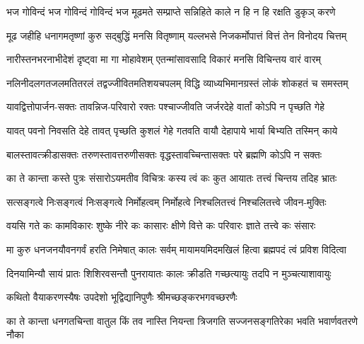 \setlength{\shlokaspaceskip}{6pt}
\setlength{\columnseprule}{0pt}
\setlength{\columnsep}{10pt}
\begin{large}
\begin{multicols}{2}
\begin{flushleft}
\fourlineindentedshloka
{भज गोविन्दं भज गोविन्दं}
{गोविन्दं भज मूढमते}
{सम्प्राप्ते सन्निहिते काले}
{न हि न हि रक्षति डुकृञ् करणे}

\fourlineindentedshloka
{मूढ जहीहि धनागमतृष्णां}
{कुरु सद्बुद्धिं मनसि वितृष्णाम्}
{यल्लभसे निजकर्मोपात्तं}
{वित्तं तेन विनोदय चित्तम्}

\fourlineindentedshloka
{नारीस्तनभरनाभीदेशं}
{दृष्ट्वा मा गा मोहावेशम्}
{एतन्मांसावसादि विकारं}
{मनसि विचिन्तय वारं वारम्}

\fourlineindentedshloka
{नलिनीदलगतजलमतितरलं}
{तद्वज्जीवितमतिशयचपलम्}
{विद्धि व्याध्यभिमानग्रस्तं}
{लोकं शोकहतं च समस्तम्}

\fourlineindentedshloka
{यावद्वित्तोपार्जन-सक्तः}
{तावन्निज-परिवारो रक्तः}
{पश्चाज्जीवति जर्जरदेहे}
{वार्तां कोऽपि न पृच्छति गेहे}

\fourlineindentedshloka
{यावत् पवनो निवसति देहे}
{तावत् पृच्छति कुशलं गेहे}
{गतवति वायौ देहापाये}
{भार्या बिभ्यति तस्मिन् काये}

\fourlineindentedshloka
{बालस्तावत्क्रीडासक्तः}
{तरुणस्तावत्तरुणीसक्तः}
{वृद्धस्तावच्चिन्तासक्तः}
{परे ब्रह्मणि कोऽपि न सक्तः}

\fourlineindentedshloka
{का ते कान्ता कस्ते पुत्रः}
{संसारोऽयमतीव विचित्रः}
{कस्य त्वं कः कुत आयातः}
{तत्त्वं चिन्तय तदिह भ्रातः}

\fourlineindentedshloka
{सत्सङ्गत्वे निःसङ्गत्वं}
{निःसङ्गत्वे निर्मोहत्वम्}
{निर्मोहत्वे निश्चलितत्त्वं}
{निश्चलितत्त्वे जीवन-मुक्तिः}

\fourlineindentedshloka
{वयसि गते कः कामविकारः}
{शुष्के नीरे कः कासारः}
{क्षीणे वित्ते कः परिवारः}
{ज्ञाते तत्त्वे कः संसारः}

\fourlineindentedshloka
{मा कुरु धनजनयौवनगर्वं}
{हरति निमेषात् कालः सर्वम्}
{मायामयमिदमखिलं हित्वा}
{ब्रह्मपदं त्वं प्रविश विदित्वा}

\fourlineindentedshloka
{दिनयामिन्यौ सायं प्रातः}
{शिशिरवसन्तौ पुनरायातः}
{कालः क्रीडति गच्छत्यायुः}
{तदपि न मुञ्चत्याशावायुः}

{कथितो वैयाकरणस्यैषः}
{उपदेशो भूद्विद्यानिपुणैः}
{श्रीमच्छङ्करभगवच्छरणैः}

\fourlineindentedshloka
{का ते कान्ता धनगतचिन्ता}
{वातुल किं तव नास्ति नियन्ता}
{त्रिजगति सज्जनसङ्गतिरेका}
{भवति भवार्णवतरणे नौका}


\end{flushleft}
\end{multicols}
\end{large}
